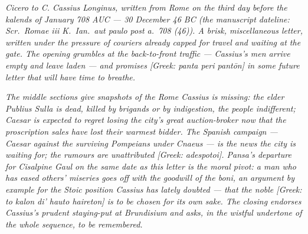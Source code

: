 
\textit{Cicero to C. Cassius Longinus, written from
Rome on the third day before the kalends of January
708 AUC --- 30 December 46 BC (the manuscript dateline:
\textit{Scr.\ Romae iii K.\ Ian.\ aut paulo post a.\ 708
(46)}). A brisk, miscellaneous letter, written under
the pressure of couriers already capped for travel and
waiting at the gate. The opening grumbles at the
back-to-front traffic --- Cassius's men arrive empty
and leave laden --- and promises \textit{[Greek: panta
peri pantōn]} in some future letter that will have time
to breathe.}

\textit{The middle sections give snapshots of the Rome
Cassius is missing: the elder Publius Sulla is dead,
killed by brigands or by indigestion, the people
indifferent; Caesar is expected to regret losing the
city's great auction-broker now that the proscription
sales have lost their warmest bidder. The Spanish
campaign --- Caesar against the surviving Pompeians
under Cnaeus --- is the news the city is waiting for;
the rumours are unattributed \textit{[Greek:
adespotoi]}. Pansa's departure for Cisalpine Gaul on
the same date as this letter is the moral pivot: a man
who has eased others' miseries goes off with the
goodwill of the \textit{boni}, an argument by example
for the Stoic position Cassius has lately doubted ---
that the noble \textit{[Greek: to kalon di' hauto
haireton]} is to be chosen for its own sake. The
closing endorses Cassius's prudent staying-put at
Brundisium and asks, in the wistful undertone of the
whole sequence, to be remembered.}
